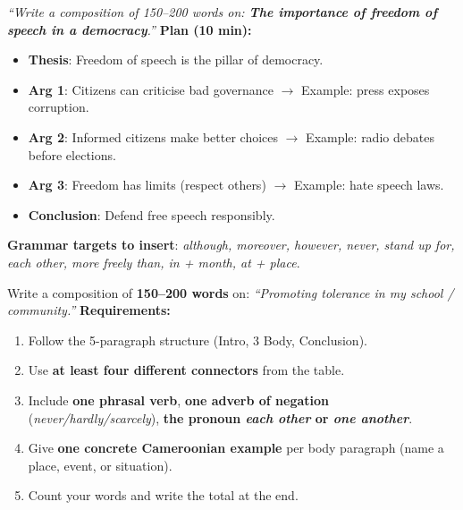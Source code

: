 \documentclass[11pt]{article}
\begin{document}
\begin{exemplebox}
\emph{``Write a composition of 150--200 words on: \textbf{The importance of freedom of speech in a democracy}.''}
\textbf{Plan (10 min):}
\begin{itemize}
\item \textbf{Thesis}: Freedom of speech is the pillar of democracy.
\item \textbf{Arg 1}: Citizens can criticise bad governance $\rightarrow$ Example: press exposes corruption.
\item \textbf{Arg 2}: Informed citizens make better choices $\rightarrow$ Example: radio debates before elections.
\item \textbf{Arg 3}: Freedom has limits (respect others) $\rightarrow$ Example: hate speech laws.
\item \textbf{Conclusion}: Defend free speech responsibly.
\end{itemize}
\textbf{Grammar targets to insert}: \emph{although, moreover, however, never, stand up for, each other, more freely than, in + month, at + place}.
\end{exemplebox}

\begin{exercice}
Write a composition of \textbf{150--200 words} on: \emph{``Promoting tolerance in my school / community.''}
\textbf{Requirements:}
\begin{enumerate}
\item Follow the 5-paragraph structure (Intro, 3 Body, Conclusion).
\item Use \textbf{at least four different connectors} from the table.
\item Include \textbf{one phrasal verb}, \textbf{one adverb of negation} (\emph{never/hardly/scarcely}), \textbf{the pronoun \emph{each other} or \emph{one another}}.
\item Give \textbf{one concrete Cameroonian example} per body paragraph (name a place, event, or situation).
\item Count your words and write the total at the end.
\end{enumerate}
\end{exercice}
\end{document}

